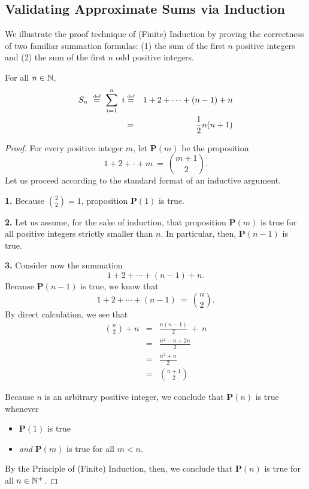 \subsection{Validating Approximate Sums via Induction}
\label{sec:Sums-Induction}


We illustrate the proof technique of (Finite) Induction by proving the
correctness of two familiar summation formulas: (1) the sum of the
first $n$ positive integers and (2) the sum of the first $n$ odd
positive integers.


\begin{center}
\label{thm:sum-1-to-n-induction}
For all $n \in \mathbb{N}$,
\begin{eqnarray}
\nonumber
S_n \ \stackrel{\mbox{{\tiny def}}}{=} \ \sum_{i=1}^n \ i
 & \stackrel{\mbox{{\tiny def}}}{=} &
 1 + 2 + \cdots + (n-1) + n \\
\label{eq:sum-first-n}
 & = & {1 \over 2} n (n+1)
\end{eqnarray}
\end{center}

\begin{proof}
For every positive integer $m$, let {\bf P}$(m)$ be the proposition
\[  1 + 2 + \cdot + m \ = \ {{m+1} \choose 2}. \]
Let us proceed according to the standard format of an inductive
argument.

{\bf 1.} Because ${\displaystyle {2 \choose 2}} = 1$, proposition {\bf
  P}$(1)$ is true.

{\bf 2.} Let us assume, for the sake of induction, that proposition
{\bf P}$(m)$ is true for all positive integers strictly smaller than
$n$.  In particular, then, {\bf P}$(n-1)$ is true.

{\bf 3.} Consider now the summation
\[ 1 + 2 + \cdots + (n-1) + n. \]
Because {\bf P}$(n-1)$ is true, we know that
\[ 1 + 2 + \cdots + (n-1) \ = \ {n \choose 2}.  \]
By direct calculation, we see that
\begin{eqnarray*}
{n \choose 2} + n
  & = & \frac{n(n-1)}{2}  \ + \ n \\ 
  & = & \frac{n^2 - n + 2n}{2} \\
  & = & \frac{n^2 + n}{2} \\
  & = & {{n+1} \choose 2}
\end{eqnarray*}

Because $n$ is an arbitrary positive integer, we conclude that
{\bf P}$(n)$ is true whenever
\begin{itemize}
\item
{\bf P}$(1)$ is true
\item
{\em and}
{\bf P}$(m)$ is true for all $m < n$.
\end{itemize}
By the Principle of (Finite) Induction, then, we conclude that {\bf
  P}$(n)$ is true for all $n \in \mathbb{N}^+$.

\end{proof}

